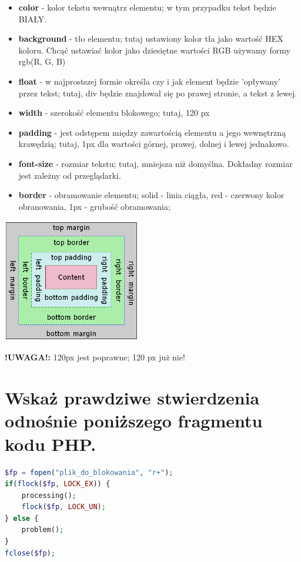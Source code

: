 \begin{itemize}
\item
\textbf{color} - kolor tekstu wewnątrz elementu; w tym przypadku tekst będzie BIAŁY.
\item
\textbf{background} - tło elementu; tutaj ustawiony kolor tła jako wartość HEX koloru. Chcąć ustawiać kolor jako dziesiętne wartości RGB używamy formy rgb(R, G, B)
\item
\textbf{float} - w najprostszej formie określa czy i jak element będzie 'opływany' przez tekst; tutaj, div będzie znajdował się po prawej stronie, a tekst z lewej.
\item
\textbf{width} - szerokość elementu blokowego; tutaj, 120 px
\item
\textbf{padding} - jest odstępem między zawartością elementu a jego wewnętrzną krawędzią; tutaj, 1px dla wartości górnej, prawej, dolnej i lewej jednakowo.
\item
\textbf{font-size} - rozmiar tekstu; tutaj, mniejsza niż domyślna. Dokładny rozmiar jest zależny od przeglądarki.
\item
\textbf{border} - obramowanie elementu; solid - linia ciągła, red - czerwony kolor obranowania, 1px - grubość obramowania;
\end{itemize}
\begin{center}
\includegraphics[width=6cm]{09/boxmodel}
\end{center}

\textbf{!UWAGA!: }120px jest poprawne; 120 px już nie!


\section{Wskaż prawdziwe stwierdzenia odnośnie poniższego fragmentu kodu PHP.}
\begin{lstlisting}[language=php]
$fp = fopen("plik_do_blokowania", "r+");
if(flock($fp, LOCK_EX)) {
	processing();
	flock($fp, LOCK_UN);
} else {
	problem();
}
fclose($fp);
\end{lstlisting}

